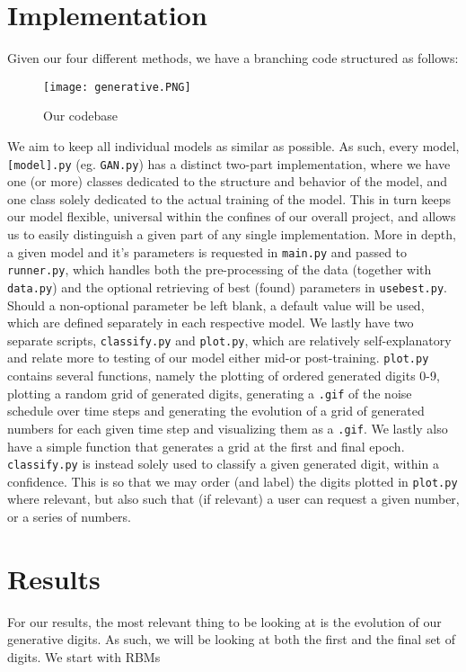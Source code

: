 \documentclass{article}
\begin{document}
\section{Implementation}
Given our four different methods, we have a branching code structured as follows:
\begin{figure}[ht!]
    \centering
    \texttt{[image: generative.PNG]}
    \caption{Our codebase}
    \label{figModel}
\end{figure}
\newline
We aim to keep all individual models as similar as possible. As such, every model, \texttt{[model].py} (eg. \texttt{GAN.py}) has a distinct two-part implementation, where we have one (or more) classes dedicated to the structure and behavior of the model, and one class solely dedicated to the actual training of the model. This in turn keeps our model flexible, universal within the confines of our overall project, and allows us to easily distinguish a given part of any single implementation.
\newline
More in depth, a given model and it's parameters is requested in \texttt{main.py} and passed to \texttt{runner.py}, which handles both the pre-processing of the data (together with \texttt{data.py}) and the optional retrieving of best (found) parameters in \texttt{usebest.py}. Should a non-optional parameter be left blank, a default value will be used, which are defined separately in each respective model.
\newline
We lastly have two separate scripts, \texttt{classify.py} and \texttt{plot.py}, which are relatively self-explanatory and relate more to testing of our model either mid-or post-training.
\newline
\texttt{plot.py} contains several functions, namely the plotting of ordered generated digits 0-9, plotting a random grid of generated digits, generating a \texttt{.gif} of the noise schedule over time steps and generating the evolution of a grid of generated numbers for each given time step and visualizing them as a \texttt{.gif}. We lastly also have a simple function that generates a grid at the first and final epoch.
\newline
\texttt{classify.py} is instead solely used to classify a given generated digit, within a confidence. This is so that we may order (and label) the digits plotted in \texttt{plot.py} where relevant, but also such that (if relevant) a user can request a given number, or a series of numbers.
\newpage
\section{Results}
For our results, the most relevant thing to be looking at is the evolution of our generative digits. As such, we will be looking at both the first and the final set of digits.
\newline
We start with RBMs
\end{document}
